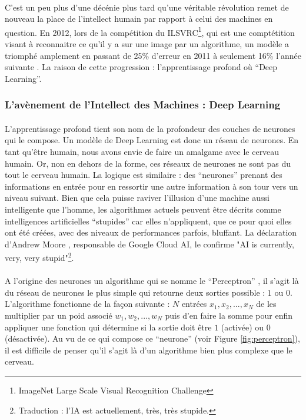 \documentclass[10pt, french, a4paper]{report}
\begin{document}
\paragraph{}
C'est un peu plus d'une décénie plus tard qu'une véritable révolution remet de nouveau la place de l'intellect humain par rapport à celui des machines en question. En 2012, lors de la compétition du ILSVRC\footnote{ImageNet Large Scale Visual Recognition Challenge}, qui est une comptétition visant à reconnaitre ce qu'il y a sur une image par un algorithme, un modèle a triomphé amplement en passant de 25\% d'erreur en 2011 à seulement 16\% l'année suivante \citep{ILSVRC15}. La raison de cette progression : l'apprentissage profond où ``Deep Learning''.

\subsubsection{L'avènement de l'Intellect des Machines : Deep Learning}

\paragraph{}
L'apprentissage profond tient son nom de la profondeur des couches de neurones qui le compose. Un modèle de Deep Learning est donc un réseau de neurones. En tant qu'être humain, nous avons envie de faire un amalgame avec le cerveau humain. Or, non en dehors de la forme, ces réseaux de neurones ne sont pas du tout le cerveau humain. La logique est similaire : des ``neurones'' prenant des informations en entrée pour en ressortir une autre information à son tour vers un niveau suivant. Bien que cela puisse raviver l’illusion d’une machine aussi intelligente que l’homme, les algorithmes actuels peuvent être décrits comme intelligences artificielles ``stupides'' car elles n’appliquent, que ce pour quoi elles ont été créées, avec des niveaux de performances parfois, bluffant. La déclaration d’Andrew Moore \citep{newsflash_ai_2018}, responsable de Google Cloud AI, le confirme "AI is currently, very, very stupid"\footnote{Traduction : l’IA est actuellement, très, très stupide.}.

\paragraph{}
A l'origine des neurones un algorithme qui se nomme le ``Perceptron'' \citep{rosenblatt_perceptron_1958}, il s'agit là du réseau de neurones le plus simple qui retourne deux sorties possible : $1$ ou $0$. L'algorithme fonctionne de la façon suivante : $N$ entrées $x_1, x_2, ..., x_N$ de les multiplier par un poid associé $w_1, w_2, ..., w_N$ puis d'en faire la somme pour enfin appliquer une fonction qui détermine si la sortie doit être $1$ (activée) ou $0$ (désactivée). Au vu de ce qui compose ce ``neurone'' (voir Figure \ref{fig:perceptron}), il est difficile de penser qu'il s'agit là d'un algorithme bien plus complexe que le cerveau.
\end{document}
